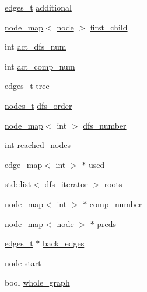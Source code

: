 \begin{DoxyCompactItemize}
\item 
\mbox{\hyperlink{edge_8h_a8f9587479bda6cf612c103494b3858e3}{edges\+\_\+t}} \mbox{\hyperlink{classbiconnectivity_ad5393f67b9526964db540fc63745318f}{additional}}
\item 
\mbox{\hyperlink{classnode__map}{node\+\_\+map}}$<$ \mbox{\hyperlink{classnode}{node}} $>$ \mbox{\hyperlink{classbiconnectivity_a3292c5b6bf3b91947509a380cf779706}{first\+\_\+child}}
\item 
int \mbox{\hyperlink{classdfs_aedaf2b485ff83150b1de6c305922473b}{act\+\_\+dfs\+\_\+num}}
\item 
int \mbox{\hyperlink{classdfs_ab0251ac30adfd569e214a64db7f3a905}{act\+\_\+comp\+\_\+num}}
\item 
\mbox{\hyperlink{edge_8h_a8f9587479bda6cf612c103494b3858e3}{edges\+\_\+t}} \mbox{\hyperlink{classdfs_aed496b618a937723bfec0b463e17e8d5}{tree}}
\item 
\mbox{\hyperlink{edge_8h_a22ac17689106ba21a84e7bc54d1199d6}{nodes\+\_\+t}} \mbox{\hyperlink{classdfs_af70a73ace68afd91ef944f984c9f28d5}{dfs\+\_\+order}}
\item 
\mbox{\hyperlink{classnode__map}{node\+\_\+map}}$<$ int $>$ \mbox{\hyperlink{classdfs_a99727f2274d6af63daae4f0518f3adbe}{dfs\+\_\+number}}
\item 
int \mbox{\hyperlink{classdfs_acb11186a1a2a2a1f38cdc0674340ba37}{reached\+\_\+nodes}}
\item 
\mbox{\hyperlink{classedge__map}{edge\+\_\+map}}$<$ int $>$ $\ast$ \mbox{\hyperlink{classdfs_afc18288747491be301d6d8d85d8f220b}{used}}
\item 
std\+::list$<$ \mbox{\hyperlink{classdfs_a15fe023a5a1f7ddda00f3d87110d9a32}{dfs\+\_\+iterator}} $>$ \mbox{\hyperlink{classdfs_a0bbd5cb8df26c891b74dadd84b46a06b}{roots}}
\item 
\mbox{\hyperlink{classnode__map}{node\+\_\+map}}$<$ int $>$ $\ast$ \mbox{\hyperlink{classdfs_a00db016ac7eab69045cae408008890c1}{comp\+\_\+number}}
\item 
\mbox{\hyperlink{classnode__map}{node\+\_\+map}}$<$ \mbox{\hyperlink{classnode}{node}} $>$ $\ast$ \mbox{\hyperlink{classdfs_a3fdeb5a211a1bc1753b2a637258c5355}{preds}}
\item 
\mbox{\hyperlink{edge_8h_a8f9587479bda6cf612c103494b3858e3}{edges\+\_\+t}} $\ast$ \mbox{\hyperlink{classdfs_a1dc18a7df8d6b238d5301c92fc7540fa}{back\+\_\+edges}}
\item 
\mbox{\hyperlink{classnode}{node}} \mbox{\hyperlink{classdfs_af677cfc31fe06a18dd3a3aae7f7d112b}{start}}
\item 
bool \mbox{\hyperlink{classdfs_ab8342c80ab208ef0e0d781f0769d0d95}{whole\+\_\+graph}}
\end{DoxyCompactItemize}



